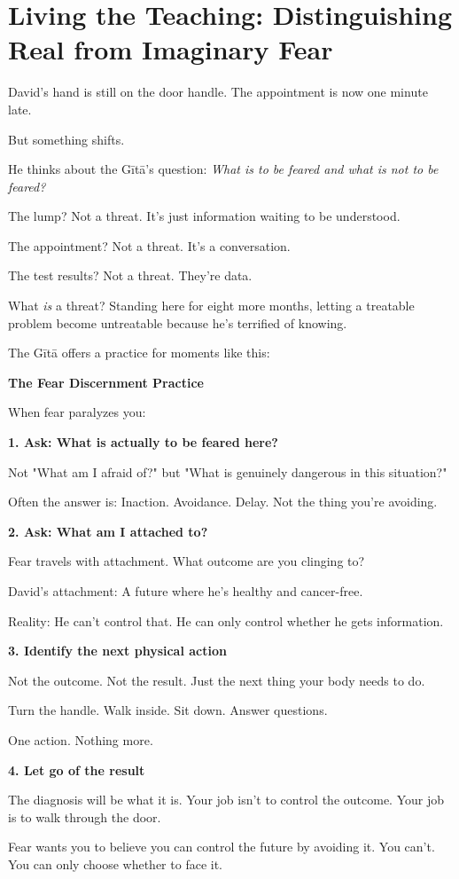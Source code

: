 \documentclass[11pt,twoside]{book}
\begin{document}
\section*{Living the Teaching: Distinguishing Real from Imaginary Fear}

David's hand is still on the door handle. The appointment is now one minute late.

But something shifts.

He thinks about the Gītā's question: \textit{What is to be feared and what is not to be feared?}

The lump? Not a threat. It's just information waiting to be understood.

The appointment? Not a threat. It's a conversation.

The test results? Not a threat. They're data.

What \textit{is} a threat? Standing here for eight more months, letting a treatable problem become untreatable because he's terrified of knowing.

The Gītā offers a practice for moments like this:

\begin{practicebox}
\textbf{The Fear Discernment Practice}

When fear paralyzes you:

\textbf{1. Ask: What is actually to be feared here?}

Not "What am I afraid of?" but "What is genuinely dangerous in this situation?"

Often the answer is: Inaction. Avoidance. Delay. Not the thing you're avoiding.

\textbf{2. Ask: What am I attached to?}

Fear travels with attachment. What outcome are you clinging to?

David's attachment: A future where he's healthy and cancer-free.

Reality: He can't control that. He can only control whether he gets information.

\textbf{3. Identify the next physical action}

Not the outcome. Not the result. Just the next thing your body needs to do.

Turn the handle. Walk inside. Sit down. Answer questions.

One action. Nothing more.

\textbf{4. Let go of the result}

The diagnosis will be what it is. Your job isn't to control the outcome. Your job is to walk through the door.

Fear wants you to believe you can control the future by avoiding it. You can't. You can only choose whether to face it.
\end{practicebox}
\end{document}
